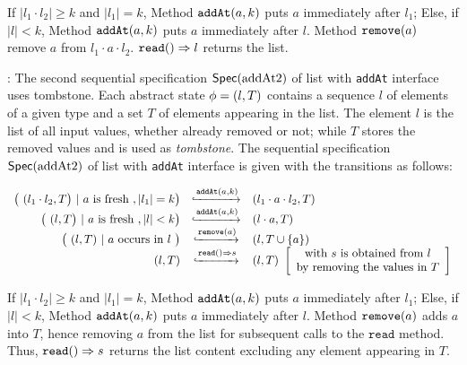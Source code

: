 If $\vert l_1 \cdot l_2 \vert \geq k$ and $\vert l_1 \vert = k$, Method $\alabelshort[\mathtt{addAt}]{a,k}$ puts $a$ immediately after $l_1$; Else, if $\vert l \vert <k$, Method $\alabelshort[\mathtt{addAt}]{a,k}$ puts $a$ immediately after $l$. Method $\alabelshort[\mathtt{remove}]{a}$ remove $a$ from $l_1 \cdot a \cdot l_2$. $\alabellong[\mathtt{read}]{}{l}{}$ returns the list.


: The second sequential specification $\specAddatTwo$ of list with {\tt addAt} interface uses tombstone. Each abstract state $\abstate = (l,T)$ contains a sequence $l$ of elements of a given type and a set $T$ of elements appearing in the list. The element $l$ is the list of all input values, whether already removed or not; while $T$ stores the removed values and is used as \emph{tombstone}. The sequential specification $\specAddatTwo$ of list with {\tt addAt} interface is given with the transitions as follows:

\[
  \begin{array}{rcl}
    \big(\ (l_1 \cdot l_2,T\big)\ |\ a\text{ is fresh}\ , \vert l_1 \vert = k \big)
     & \specarrow{\alabelshort[\mathtt{addAt}]{a,k}}
     & (l_1 \cdot a \cdot l_2,T)\\
     \big(\ (l,T\big)\ |\ a\text{ is fresh}\ , \vert l \vert < k \big)
     & \specarrow{\alabelshort[\mathtt{addAt}]{a,k}}
     & (l \cdot a,T)\\
     \big(\ (l,T)\ |\ a\ \text{occurs in}\ l\ \big)
     & \specarrow{\alabelshort[\mathtt{remove}]{a}}
     & (l,T \cup \{a\})\\
     (l,T)
     & \specarrow{\alabellong[\mathtt{read}]{}{s}{}}
     & (l,T)\
       \left[\begin{array}{c}
           \text{with $s$ is obtained from $l$}\\
           \text{by removing the values in $T$}
       \end{array}\right]
   \end{array}
\]

If $\vert l_1 \cdot l_2 \vert \geq k$ and $\vert l_1 \vert = k$, Method $\alabelshort[\mathtt{addAt}]{a,k}$ puts $a$ immediately after $l_1$; Else, if $\vert l \vert <k$, Method $\alabelshort[\mathtt{addAt}]{a,k}$ puts $a$ immediately after $l$. Method $\alabelshort[\mathtt{remove}]{a}$ adds $a$ into $T$, hence removing $a$ from the list for subsequent calls to the $\mathtt{read}$ method. Thus, $\alabellong[\mathtt{read}]{}{s}{}$ returns the list content excluding any element appearing in $T$.



